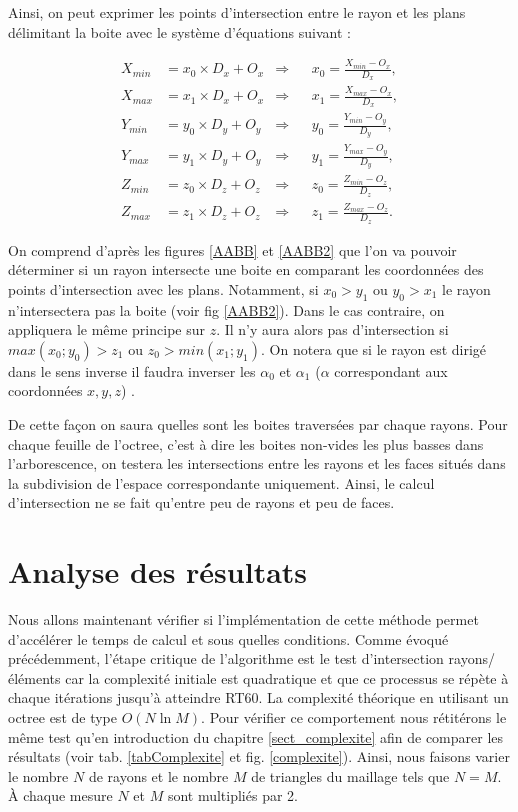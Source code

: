 Ainsi, on peut exprimer les points d'intersection entre le rayon et les plans délimitant la boite avec le système d'équations suivant :

\begin{align*}
X_{min} &= x_0 \times D_x + O_x 	& \Rightarrow 	& &	 x_0 = \frac{X_{min} - O_x}{D_x}, \\
X_{max} &= x_1 \times D_x + O_x 	& \Rightarrow 	& &	x_1 = \frac{X_{max} - O_x}{D_x}, \\
Y_{min} &= y_0 \times D_y + O_y 	& \Rightarrow	& &	y_0 = \frac{Y_{min} - O_y}{D_y}, \\
Y_{max} &= y_1 \times D_y + O_y 	& \Rightarrow	& &	y_1 = \frac{Y_{max} - O_y}{D_y}, \\
Z_{min} &= z_0 \times D_z + O_z	& \Rightarrow 	& &	z_0 = \frac{Z_{min} - O_z}{D_z}, \\
Z_{max} &= z_1 \times D_z + O_z 	& \Rightarrow 	& &	z_1 = \frac{Z_{max} - O_z}{D_z}. 
\end{align*}

On comprend d'après les figures \ref{AABB} et \ref{AABB2} que l'on va pouvoir déterminer si un rayon intersecte une boite en comparant les coordonnées des points d'intersection avec les plans. Notamment, si $x_0 > y_1$ ou $y_0 > x_1$ le rayon n'intersectera pas la boite (voir fig \ref{AABB2}). Dans le cas contraire, on appliquera le même principe sur $z$. Il n'y aura alors pas d'intersection si $max(x_0 ; y_0) > z_1$ ou $ z_0 > min(x_1 ; y_1)$. On notera que si le rayon est dirigé dans le sens inverse il faudra inverser les $\alpha_0$ et $\alpha_1$ ($\alpha$ correspondant aux coordonnées $x,y,z$) .

De cette façon on saura quelles sont les boites traversées par chaque rayons. Pour chaque feuille de l'\gls{octree}, c'est à dire les boites non-vides les plus basses dans l'arborescence, on testera les intersections entre les rayons et les faces situés dans la subdivision de l'espace correspondante uniquement. Ainsi, le calcul d'intersection ne se fait qu'entre peu de rayons et peu de faces.



\section{Analyse des résultats} \label{sect_resultatOctree}

Nous allons maintenant vérifier si l'implémentation de cette méthode permet d'accélérer le temps de calcul et sous quelles conditions. Comme évoqué précédemment, l'étape critique de l'algorithme est le test d'intersection rayons/éléments car la complexité initiale est quadratique et que ce processus se répète à chaque itérations jusqu'à atteindre \gls{RT60}. La complexité théorique en utilisant un \gls{octree} est de type $O(N\ln{M})$. 
Pour vérifier ce comportement nous rétitérons le même test qu'en introduction du chapitre \ref{sect_complexite} afin de comparer les résultats (voir tab. \ref{tabComplexite} et fig. \ref{complexite}). Ainsi, nous faisons varier le nombre $N$ de rayons et le nombre $M$ de triangles du maillage tels que $N = M$. À chaque mesure $N$ et $M$ sont multipliés par 2.

